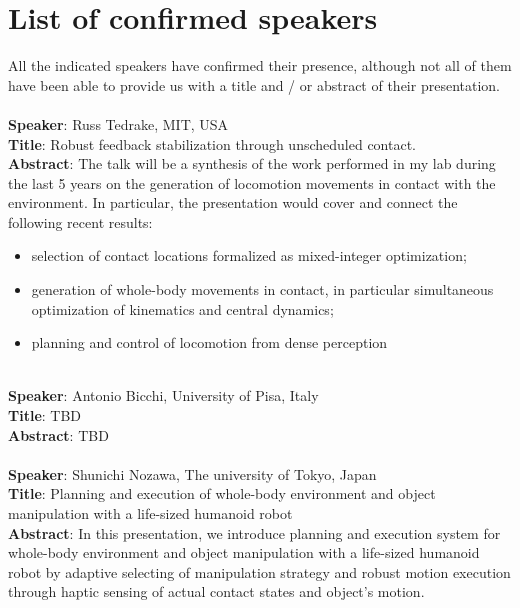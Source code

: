 \documentclass[conference]{IEEEtran}
\begin{document}
\section{List of confirmed speakers}

All the indicated speakers have confirmed their presence, although not all of them have been able to provide us with a title and / or abstract
of their presentation.\\ \\
\textbf{Speaker}: Russ Tedrake, MIT, USA \\
\textbf{Title}:  Robust feedback stabilization through unscheduled contact.\\
\textbf{Abstract}: The talk will be a synthesis of the work performed in my lab during the last 5 years on the generation of locomotion movements in contact with the environment. In particular, the presentation would cover and connect the following recent results:
\begin{itemize}
\item selection of contact locations formalized as mixed-integer optimization;
\item generation of whole-body movements in contact, in particular simultaneous optimization of kinematics and  central dynamics;
\item planning and control of locomotion from dense perception \\ \\ 
\end{itemize}
\textbf{Speaker}: Antonio Bicchi, University of Pisa, Italy\\
\textbf{Title}: TBD \\
\textbf{Abstract}: TBD \\ \\
\textbf{Speaker}: Shunichi Nozawa, The university of Tokyo, Japan \\
\textbf{Title}:  Planning and execution of whole-body environment and object
manipulation with a life-sized humanoid robot \\
\textbf{Abstract}: In this presentation, we introduce planning and execution system for whole-body environment and object manipulation with a life-sized humanoid robot by adaptive selecting of manipulation strategy and robust motion execution through haptic sensing of actual contact states and object's motion. \\ \\
\end{document}
